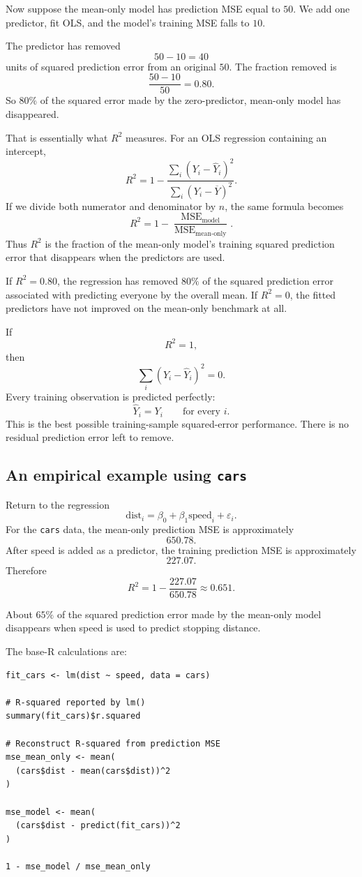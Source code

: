 \documentclass[11pt]{report}
\newcommand{\MSE}{\operatorname{MSE}}
\begin{document}
Now suppose the mean-only model has prediction MSE equal to \(50\). We add one predictor, fit OLS, and the model's training MSE falls to \(10\).

The predictor has removed
\[
50-10=40
\]
units of squared prediction error from an original \(50\). The fraction removed is
\[
\frac{50-10}{50}=0.80.
\]
So \(80\%\) of the squared error made by the zero-predictor, mean-only model has disappeared.

That is essentially what \(R^2\) measures. For an OLS regression containing an intercept,
\[
R^2
=
1-
\frac{\sum_i(Y_i-\widehat{Y}_i)^2}
{\sum_i(Y_i-\overline{Y})^2}.
\]
If we divide both numerator and denominator by \(n\), the same formula becomes
\[
\boxed{
R^2
=
1-
\frac{\MSE_{\text{model}}}
{\MSE_{\text{mean-only}}}.
}
\]
Thus \(R^2\) is the fraction of the mean-only model's training squared prediction error that disappears when the predictors are used.

If \(R^2=0.80\), the regression has removed \(80\%\) of the squared prediction error associated with predicting everyone by the overall mean. If \(R^2=0\), the fitted predictors have not improved on the mean-only benchmark at all.

If
\[
R^2=1,
\]
then
\[
\sum_i(Y_i-\widehat{Y}_i)^2=0.
\]
Every training observation is predicted perfectly:
\[
\widehat{Y}_i=Y_i
\qquad\text{for every }i.
\]
This is the best possible training-sample squared-error performance. There is no residual prediction error left to remove.

\subsection{An empirical example using \texttt{cars}}

Return to the regression
\[
\text{dist}_i
=
\beta_0+\beta_1\text{speed}_i+\varepsilon_i.
\]
For the \texttt{cars} data, the mean-only prediction MSE is approximately
\[
650.78.
\]
After speed is added as a predictor, the training prediction MSE is approximately
\[
227.07.
\]
Therefore
\[
R^2
=
1-\frac{227.07}{650.78}
\approx 0.651.
\]

About \(65\%\) of the squared prediction error made by the mean-only model disappears when speed is used to predict stopping distance.

The base-R calculations are:

\begin{lstlisting}
fit_cars <- lm(dist ~ speed, data = cars)

# R-squared reported by lm()
summary(fit_cars)$r.squared

# Reconstruct R-squared from prediction MSE
mse_mean_only <- mean(
  (cars$dist - mean(cars$dist))^2
)

mse_model <- mean(
  (cars$dist - predict(fit_cars))^2
)

1 - mse_model / mse_mean_only
\end{lstlisting}
\end{document}
